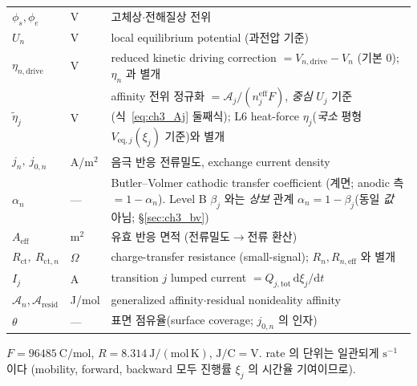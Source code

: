 \documentclass[11pt,a4paper]{article}
\newcommand{\dd}{\mathrm{d}}
\newcommand{\eff}{\mathrm{eff}}
\newcommand{\eq}{\mathrm{eq}}
\newcommand{\drive}{\mathrm{drive}}
\newcommand{\tot}{\mathrm{tot}}
\newcommand{\ct}{\mathrm{ct}}
\newcommand{\resid}{\mathrm{resid}}
\begin{document}
\begin{longtable}{p{} p{} >{\raggedright\arraybackslash}p{}}
$\phi_s,\phi_e$ & V & 고체상$\cdot$전해질상 전위 \\
$U_n$ & V & local equilibrium potential (과전압 기준) \\
$\eta_{n,\drive}$ & V & reduced kinetic driving correction $=V_{n,\drive}-V_n$ (기본 $0$); $\eta_n$ 과 별개 \\
$\tilde\eta_j$ & V & affinity 전위 정규화 $=\mathcal A_j/(n_j^\eff F)$, \emph{중심} $U_j$ 기준(식~\eqref{eq:ch3_Aj} 둘째식); L6 heat-force $\eta_j$(\emph{국소} 평형 $V_{\eq,j}(\xi_j)$ 기준)와 별개 \\
$j_n,\ j_{0,n}$ & A/m$^2$ & 음극 반응 전류밀도, exchange current density \\
$\alpha_n$ & --- & Butler--Volmer cathodic transfer coefficient (계면; anodic 측 $=1-\alpha_n$). Level B $\beta_j$ 와는 \emph{상보} 관계 $\alpha_n=1-\beta_j$(동일 \emph{값} 아님; \S\ref{sec:ch3_bv}) \\
$A_\eff$ & m$^2$ & 유효 반응 면적 (전류밀도$\to$전류 환산) \\
$R_\ct,\ R_{\ct,n}$ & $\Omega$ & charge-transfer resistance (small-signal); $R_n,R_{n,\eff}$ 와 별개 \\
$I_j$ & A & transition $j$ lumped current $=Q_{j,\tot}\,\dd\xi_j/\dd t$ \\
$\mathcal A_n,\mathcal A_{\resid}$ & J/mol & generalized affinity$\cdot$residual nonideality affinity \\
$\theta$ & --- & 표면 점유율(surface coverage; $j_{0,n}$ 의 인자) \\
\bottomrule
\end{longtable}
$F=96485\ \mathrm{C/mol}$, $R=8.314\ \mathrm{J/(mol\,K)}$, $\mathrm{J/C}=\mathrm V$. rate 의 단위는
일관되게 $\mathrm{s^{-1}}$ 이다 (mobility, forward, backward 모두 진행률 $\xi_j$ 의 시간율 기여이므로).

\end{document}
